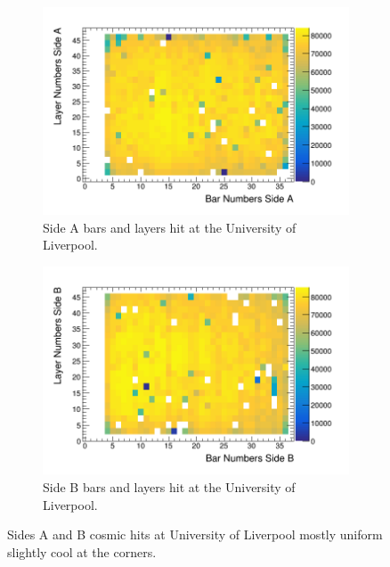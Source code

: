 \documentclass[12pt,a4paper]{article}
\begin{document}
\begin{figure}[H]
\centering
\begin{subfigure}{.5\textwidth}
  \centering
  \includegraphics[width=\linewidth]{sidesAB/liverpoolSideAHits.png}
  \captionsetup{width=.9\linewidth}
  \caption{Side A bars and layers hit at the University of Liverpool.}
  \label{subFig:pvtLiverpool}
\end{subfigure}%
\begin{subfigure}{.5\textwidth}
  \centering
  \includegraphics[width=\linewidth]{sidesAB/liverpoolSideBHits.png}
  \captionsetup{width=.9\linewidth}
  \caption{Side B bars and layers hit at the University of Liverpool.}
  \label{subFig:pvtWylfa}
\end{subfigure}
\caption{Sides A and B cosmic hits at University of Liverpool mostly uniform slightly cool at the corners.}
\label{fig:pvtWylfaAndLiverpool}
\end{figure}
\end{document}
